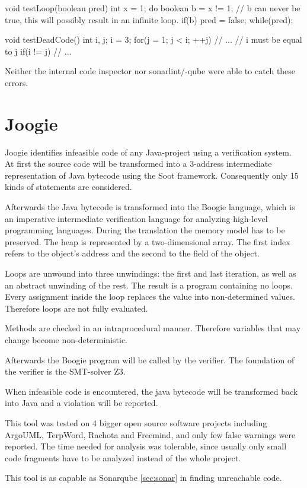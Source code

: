 \begin{program}[h!]
	\begin{JavaCode}
void testLoop(boolean pred) {
	int x = 1;
	do {
		boolean b = x != 1;
		// b can never be true, this will possibly result in an infinite loop.
		if(b) {
			pred = false;
		}
	} while(pred);
}

void testDeadCode() {
	int i, j;
	i = 3;
	for(j = 1; j < i; ++j) {
		// ...
	}
	// i must be equal to j
	if(i != j) { 
		// ...
	}
}\end{JavaCode}
	\caption{Neither the internal code inspector nor sonarlint/-qube were able to catch these errors. }
	\label{code:Java sonarqube hard example}
\end{program}

\clearpage
\section{Joogie}
\label{sec:sca paper}
Joogie \cite{arltJoogieInfeasibleCode2012, arltJoogieJavaJimple2013} identifies infeasible code of any Java-project using a verification system. 
At first the source code will be transformed into a 3-address intermediate representation of Java bytecode using the Soot framework. Consequently only 15 kinds of statements are considered. 

Afterwards the Java bytecode is transformed into the Boogie language, which is an imperative intermediate verification language for analyzing high-level programming languages.
During the translation the memory model has to be preserved. The heap is represented by a two-dimensional array. The first index refers to the object's address and the second to the field of the object.

Loops are unwound into three unwindings: the first and last iteration, as well as an abstract unwinding of the rest.
The result is a program containing no loops. Every assignment inside the loop replaces the value into non-determined values. Therefore loops are not fully evaluated.


Methods are checked in an intraprocedural manner. Therefore variables that may change become non-deterministic. 


Afterwards the Boogie program will be called by the verifier. 
The foundation of the verifier is the SMT-solver Z3.



When infeasible code is encountered, the java bytecode will be transformed back into Java and a violation will be reported.


This tool was tested on 4 bigger open source software projects including ArgoUML, TerpWord, Rachota and Freemind, and only few false warnings were reported.
The time needed for analysis was tolerable, since usually only small code fragments have to be analyzed instead of the whole project.

This tool is as capable as Sonarqube \ref{sec:sonar} in finding unreachable code.

